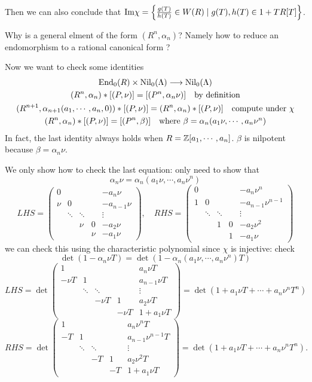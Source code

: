 Then we can also conclude that $\mathrm{Im} \chi =\left\{\frac{g(T)}{h(T)}\in W(R)\mid g(T),h(T) \in 1+TR[T]\right\}$.
{\color{red}
\begin{remark}
	Why is a general elment of the form $(R^n,\alpha_n)$? Namely how to reduce an endomorphism to a rational canonical form ?
\end{remark}}
Now we want to check some identities
\begin{gather*}
	\mathrm{End}_0(R)\times \mathrm{Nil}_0(\Lambda) \longrightarrow \mathrm{Nil}_0(\Lambda) \\
	(R^n,\alpha_n )*[(P,\nu)]=[(P^n,\alpha_n \nu)] \quad \mbox{by definition}\\
	(R^{n+1},\alpha_{n+1}(a_1,\cdots,a_n,0))*[(P,\nu)]=(R^n,\alpha_n )*[(P,\nu)] \quad \mbox{compute under $\chi$}\\
	(R^n,\alpha_n )*[(P,\nu)]=[(P^n,\beta)] \quad \mbox{where $\beta=\alpha_n(a_1\nu,\cdots,a_n\nu^n)$}
\end{gather*}
In fact, the last identity always holds when $R=\mathbb{Z}[a_1,\cdots,a_n]$. $\beta$ is nilpotent because $\beta =\alpha_n\nu$.

We only show how to check the last equation: only need to show that 
$$\alpha_n \nu =\alpha_n(a_1\nu,\cdots,a_n\nu^n)$$
\[LHS=\begin{pmatrix}
	0& & & & -a_n\nu\\
	\nu &0& & & -a_{n-1}\nu\\
	 &\ddots&\ddots& &\vdots\\
	 & & \nu &0&-a_2\nu\\
	 & & & \nu &-a_1\nu 
\end{pmatrix},\quad RHS=\begin{pmatrix}
	0& & & & -a_n\nu^n\\
	1&0& & & -a_{n-1}\nu^{n-1}\\
	 &\ddots&\ddots& &\vdots\\
	 & & 1&0&-a_2\nu^2\\
	 & & & 1&-a_1\nu 
\end{pmatrix}\]
we can check this using the characteristic polynomial since $\chi$ is injective: check
\[\det (1-\alpha_n \nu T) = \det (1-\alpha_n(a_1\nu,\cdots,a_n\nu^n)T)\]
\[LHS=\det \begin{pmatrix}
	1& & & & a_n \nu T\\
	-\nu T&1& & & a_{n-1} \nu T\\
	 &\ddots&\ddots& &\vdots\\
	 & & -\nu T&1&a_2 \nu T\\
	 & & & -\nu T&1+a_1 \nu T 
\end{pmatrix}=\det(1+a_1\nu T+\cdots+a_n\nu^nT^n)\]
\[RHS=\det \begin{pmatrix}
	1& & & & a_n\nu^n T\\
	-T&1& & & a_{n-1}\nu^{n-1} T\\
	 &\ddots&\ddots& &\vdots\\
	 & & -T&1&a_2\nu^2 T\\
	 & & & -T&1+a_1 \nu T
\end{pmatrix}=\det(1+a_1\nu T+\cdots+a_n\nu^nT^n).\]

